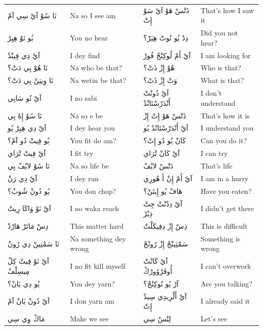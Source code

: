 \documentclass[12pt]{article}
\begin{document}
\begin{longtable}{A p{3.2cm} A p{3.2cm}}
نَا سُوْ آيْ سِي آمْ & Na so I see am & ذَتْسْ هَوْ آيْ سَوْ إِتْ & That’s how I saw it \\
يُو نَوْ هِيِرْ & You no hear & دِدْ يُو نُوتْ هِيَرْ؟ & Did you not hear? \\
آيْ دِي فِينْدْ & I dey find & آيْ أَمْ لُوكِنْجْ فُورْ & I am looking for \\
نَا هُوْ بِي دَتْ؟ & Na who be that? & هُوْ إِزْ ذَتْ؟ & Who is that? \\
نَا وِيتِنْ بِي دَتْ؟ & Na wetin be that? & وَتْ إِزْ ذَتْ؟ & What is that? \\
آيْ نُو سَابِي & I no sabi & آيْ دُونْتْ أَنْدَرْسْتَانْدْ & I don’t understand \\
نَا سُوْ إِهْ بِي & Na so e be & ذَتْسْ هَوْ إِتْ إِزْ & That’s how it is \\
آيْ دِي هِيِرْ يُو & I dey hear you & آيْ أَنْدَرْسْتَانْدْ يُو & I understand you \\
يُو فِيتْ دُو آمْ؟ & You fit do am? & كَانْ يُو دُو إِتْ؟ & Can you do it? \\
آيْ فِيتْ تْرَاي & I fit try & آيْ كَانْ تْرَاي & I can try \\
نَا سُوْ لايْفْ بِي & Na so life be & ذَتْسْ لايْفْ & That’s life \\
آيْ دِي رَنْ & I dey run & آيْ أَمْ إِنْ أَ هُورِي & I am in a hurry \\
يُو دُونْ شُوبْ؟ & You don chop? & هَافْ يُو إِيتَنْ؟ & Have you eaten? \\
آيْ نَوْ وَاكَا رِيتْ & I no waka reach & آيْ دِدْنْتْ جِتْ ذِيْرْ & I didn’t get there \\
دِسْ مَاتَرْ هَارْدْ & This matter hard & ذِسْ إِزْ دِفِيكَلْتْ & This is difficult \\
نَا سَمْتِينْ دِي رُونْ & Na something dey wrong & سَمْثِينْجْ إِزْ رُونْجْ & Something is wrong \\
آيْ نَوْ فِيتْ كِلْ مِيسِلْفْ & I no fit kill myself & آيْ كَانْتْ أُوفَرْوُورْكْ & I can’t overwork \\
يُو دِي يَانْ؟ & You dey yarn? & آرْ يُو تُوكِنْجْ؟ & Are you talking? \\
آيْ دُونْ يَانْ آمْ & I don yarn am & آيْ أَلْرِيدِي سِيدْ إِتْ & I already said it \\
مَاكْ وِي سِي & Make we see & لِتْسْ سِي & Let’s see \\


\end{longtable}
\end{document}
